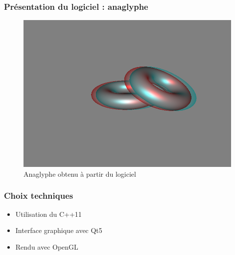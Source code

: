 \documentclass{beamer}
\begin{document}
%
\begin{frame}
\frametitle{Présentation du logiciel : anaglyphe}
\begin{figure}
\centering
\includegraphics[scale=0.4]{donuts_photoshop.png}
\caption{Anaglyphe obtenu à partir du logiciel}
\end{figure}
\end{frame}



\begin{frame}
\frametitle{Choix techniques}
\begin{itemize}[label=$\bullet$]
	\item Utilisation du C++11
	\item Interface graphique avec Qt5
	\item Rendu avec OpenGL
\end{itemize}

\end{frame}
\end{document}
